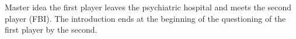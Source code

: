 \begin{introduction}

Master idea
the first player leaves the psychiatric hospital and meets the second player (FBI). The introduction ends at the beginning of the questioning of the first player by the second.

\end{introduction}


